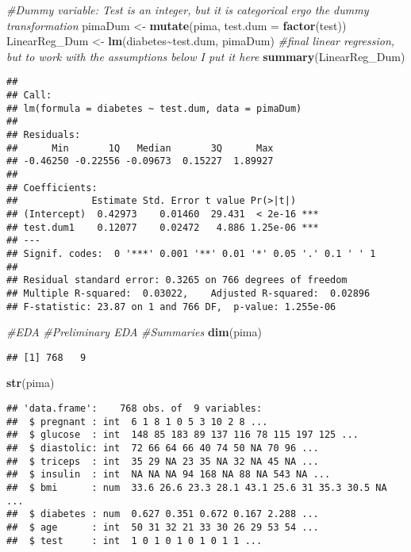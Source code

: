 \documentclass[
]{article}
\newenvironment{Shaded}{\begin{snugshade}}{\end{snugshade}}
\newcommand{\AttributeTok}[1]{\textcolor[rgb]{0.13,0.29,0.53}{#1}}
\newcommand{\CommentTok}[1]{\textcolor[rgb]{0.56,0.35,0.01}{\textit{#1}}}
\newcommand{\FunctionTok}[1]{\textcolor[rgb]{0.13,0.29,0.53}{\textbf{#1}}}
\newcommand{\NormalTok}[1]{#1}
\newcommand{\OtherTok}[1]{\textcolor[rgb]{0.56,0.35,0.01}{#1}}
\newcommand{\SpecialCharTok}[1]{\textcolor[rgb]{0.81,0.36,0.00}{\textbf{#1}}}
\begin{document}
\begin{Shaded}
\begin{Highlighting}[]
\CommentTok{\#Dummy variable: Test is an integer, but it is categorical ergo the dummy transformation}
\NormalTok{pimaDum }\OtherTok{\textless{}{-}} \FunctionTok{mutate}\NormalTok{(pima, }\AttributeTok{test.dum =} \FunctionTok{factor}\NormalTok{(test))}
\NormalTok{LinearReg\_Dum }\OtherTok{\textless{}{-}} \FunctionTok{lm}\NormalTok{(diabetes}\SpecialCharTok{\textasciitilde{}}\NormalTok{test.dum, pimaDum) }\CommentTok{\#final linear regression, but to work with the assumptions below I put it here}
\FunctionTok{summary}\NormalTok{(LinearReg\_Dum)}
\end{Highlighting}
\end{Shaded}

\begin{verbatim}
## 
## Call:
## lm(formula = diabetes ~ test.dum, data = pimaDum)
## 
## Residuals:
##      Min       1Q   Median       3Q      Max 
## -0.46250 -0.22556 -0.09673  0.15227  1.89927 
## 
## Coefficients:
##             Estimate Std. Error t value Pr(>|t|)    
## (Intercept)  0.42973    0.01460  29.431  < 2e-16 ***
## test.dum1    0.12077    0.02472   4.886 1.25e-06 ***
## ---
## Signif. codes:  0 '***' 0.001 '**' 0.01 '*' 0.05 '.' 0.1 ' ' 1
## 
## Residual standard error: 0.3265 on 766 degrees of freedom
## Multiple R-squared:  0.03022,    Adjusted R-squared:  0.02896 
## F-statistic: 23.87 on 1 and 766 DF,  p-value: 1.255e-06
\end{verbatim}

\begin{Shaded}
\begin{Highlighting}[]
\CommentTok{\#EDA}
\CommentTok{\#Preliminary EDA}
    \CommentTok{\#Summaries}
    \FunctionTok{dim}\NormalTok{(pima)}
\end{Highlighting}
\end{Shaded}

\begin{verbatim}
## [1] 768   9
\end{verbatim}

\begin{Shaded}
\begin{Highlighting}[]
    \FunctionTok{str}\NormalTok{(pima)}
\end{Highlighting}
\end{Shaded}

\begin{verbatim}
## 'data.frame':    768 obs. of  9 variables:
##  $ pregnant : int  6 1 8 1 0 5 3 10 2 8 ...
##  $ glucose  : int  148 85 183 89 137 116 78 115 197 125 ...
##  $ diastolic: int  72 66 64 66 40 74 50 NA 70 96 ...
##  $ triceps  : int  35 29 NA 23 35 NA 32 NA 45 NA ...
##  $ insulin  : int  NA NA NA 94 168 NA 88 NA 543 NA ...
##  $ bmi      : num  33.6 26.6 23.3 28.1 43.1 25.6 31 35.3 30.5 NA ...
##  $ diabetes : num  0.627 0.351 0.672 0.167 2.288 ...
##  $ age      : int  50 31 32 21 33 30 26 29 53 54 ...
##  $ test     : int  1 0 1 0 1 0 1 0 1 1 ...
\end{verbatim}
\end{document}
